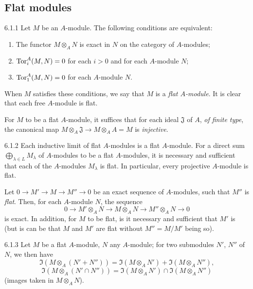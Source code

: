 \subsection{Flat modules}
\label{0-prelim-6.1}

\begin{env}{6.1.1}
\label{env-0.6.1.1}
Let $M$ be an $A$-module. The following conditions are equivalent:
\begin{enumerate}[label=(\alph*)]
  \item The functor $M\otimes_A N$ is exact in $N$ on the category of
        $A$-modules;
  \item ${\mathop{\mathrm{Tor}}\nolimits}_i^A(M,N)=0$ for each $i>0$ and for each $A$-module $N$;
  \item ${\mathop{\mathrm{Tor}}\nolimits}_1^A(M,N)=0$ for each $A$-module $N$.
\end{enumerate}

When $M$ satisfies these conditions, we say that $M$ is a
\emph{flat $A$-module}. It is clear that each free $A$-module is flat.

For $M$ to be a flat $A$-module, it suffices that for each ideal $\mathfrak{J}$
of $A$, \emph{of finite type}, the canonical map
$M\otimes_A\mathfrak{J}\to M\otimes_A A=M$ is \emph{injective}.
\end{env}

\begin{env}{6.1.2}
\label{env-0.6.1.2}
Each inductive limit of flat $A$-modules is a flat $A$-module. For a direct sum
$\bigoplus_{\lambda\in L}M_\lambda$ of $A$-modules to be a flat $A$-modules, it
is necessary and sufficient that each of the $A$-modules $M_\lambda$ is flat. In
particular, every projective $A$-module is flat.

Let $0\to M'\to M\to M''\to 0$ be an exact sequence of $A$-modules, such that
$M''$ is \emph{flat}. Then, for each $A$-module $N$, the sequence
\[
  0\longrightarrow M'\otimes_A N\longrightarrow M\otimes_A N
  \longrightarrow M''\otimes_A N\longrightarrow 0
\]
is exact. In addition, for $M$ to be flat, is it necessary and sufficient that
$M'$ is (but is can be that $M$ and $M'$ are flat without $M''=M/M'$ being so).
\end{env}

\begin{env}{6.1.3}
\label{env-0.6.1.3}
Let $M$ be a flat $A$-module, $N$ any $A$-module; for two submodules $N'$, $N''$
of $N$, we then have
\[
  \Im(M\otimes_A(N'+N''))=\Im(M\otimes_A N')+\Im(M\otimes_A N''),
\]
\[
  \Im(M\otimes_A(N'\cap N''))=\Im(M\otimes_A N')\cap\Im(M\otimes_A N'')
\]
(images taken in $M\otimes_A N$).
\end{env}


